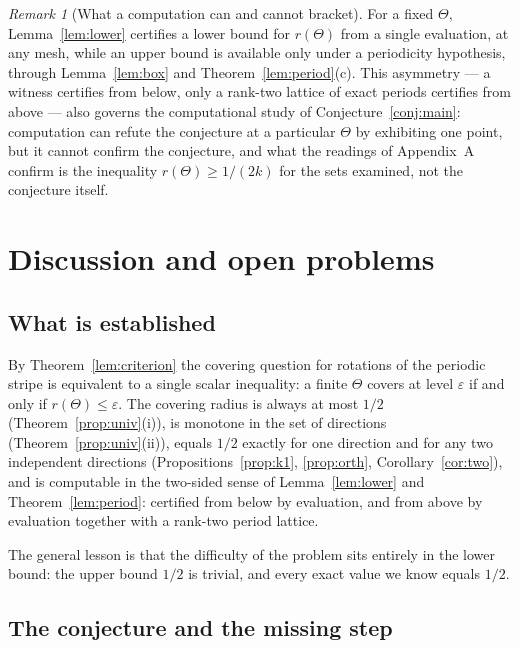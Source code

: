 \documentclass[11pt]{article}
\theoremstyle{plain}
\theoremstyle{definition}
\theoremstyle{remark}
\newtheorem{remark}[theorem]{Remark}
\begin{document}
\begin{remark}[What a computation can and cannot bracket]
\label{rem:twoSided}
For a fixed $\Theta$, Lemma~\ref{lem:lower} certifies a lower bound for $r(\Theta)$ from a single
evaluation, at any mesh, while an upper bound is available only under a periodicity hypothesis, through
Lemma~\ref{lem:box} and Theorem~\ref{lem:period}(c). This asymmetry --- a witness certifies from below,
only a rank-two lattice of exact periods certifies from above --- also governs the computational study
of Conjecture~\ref{conj:main}: computation can refute the conjecture at a particular $\Theta$ by
exhibiting one point, but it cannot confirm the conjecture, and what the readings of Appendix~A confirm
is the inequality $r(\Theta)\ge1/(2k)$ for the sets examined, not the conjecture itself.
\end{remark}

\section{Discussion and open problems}
\label{sec:disc}

\subsection{What is established}

By Theorem~\ref{lem:criterion} the covering question for rotations of the periodic stripe is equivalent
to a single scalar inequality: a finite $\Theta$ covers at level $\varepsilon$ if and only if
$r(\Theta)\le\varepsilon$. The covering radius is always at most $1/2$
(Theorem~\ref{prop:univ}(i)), is monotone in the set of directions
(Theorem~\ref{prop:univ}(ii)), equals $1/2$ exactly for one direction and for any two independent
directions (Propositions~\ref{prop:k1}, \ref{prop:orth}, Corollary~\ref{cor:two}), and is computable in
the two-sided sense of Lemma~\ref{lem:lower} and Theorem~\ref{lem:period}: certified from below by evaluation,
and from above by evaluation together with a rank-two period lattice.

The general lesson is that the difficulty of the problem sits entirely in the lower bound: the upper
bound $1/2$ is trivial, and every exact value we know equals $1/2$.

\subsection{The conjecture and the missing step}
\end{document}
